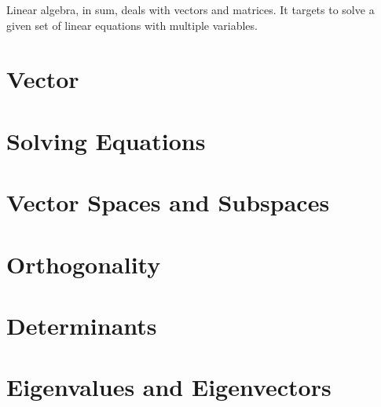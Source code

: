 \documentclass{report}
\begin{document}
	Linear algebra, in sum, deals with vectors and matrices. It targets to solve a given set of linear equations with multiple variables.
	\section{Vector}
		\subsection{}
	\section{Solving Equations}
		\subsection{}
	\section{Vector Spaces and Subspaces}
		\subsection{}
	\section{Orthogonality}
		\subsection{}
	\section{Determinants}
		\subsection{}
	\section{Eigenvalues and Eigenvectors}
		\subsection{}
\end{document}

